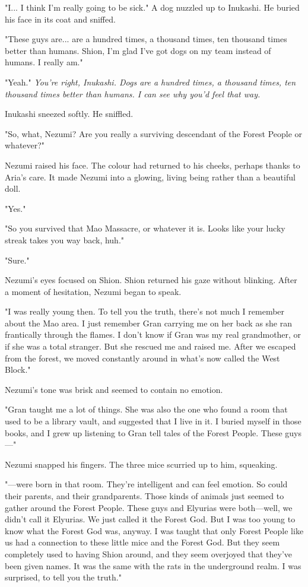 "I... I think I'm really going to be sick." A dog nuzzled up to
Inukashi. He buried his face in its coat and sniffed.

"These guys are... are a hundred times, a thousand times, ten thousand
times better than humans. Shion, I'm glad I've got dogs on my team
instead of humans. I really am."

"Yeah." \emph{You're right, Inukashi. Dogs are a hundred times, a thousand
times, ten thousand times better than humans. I can see why you'd feel
that way.}

Inukashi sneezed softly. He sniffled.

"So, what, Nezumi? Are you really a surviving descendant of the Forest
People or whatever?"

Nezumi raised his face. The colour had returned to his cheeks, perhaps
thanks to Aria's care. It made Nezumi into a glowing, living being
rather than a beautiful doll.

"Yes."

"So you survived that Mao Massacre, or whatever it is. Looks like your
lucky streak takes you way back, huh."

"Sure."

Nezumi's eyes focused on Shion. Shion returned his gaze without
blinking. After a moment of hesitation, Nezumi began to speak.

"I was really young then. To tell you the truth, there's not much I
remember about the Mao area. I just remember Gran carrying me on her
back as she ran frantically through the flames. I don't know if Gran was
my real grandmother, or if she was a total stranger. But she rescued me
and raised me. After we escaped from the forest, we moved constantly
around in what's now called the West Block."

Nezumi's tone was brisk and seemed to contain no emotion.

"Gran taught me a lot of things. She was also the one who found a room
that used to be a library vault, and suggested that I live in it. I
buried myself in those books, and I grew up listening to Gran tell tales
of the Forest People. These guys---"

Nezumi snapped his fingers. The three mice scurried up to him,
squeaking.

"---were born in that room. They're intelligent and can feel emotion. So
could their parents, and their grandparents. Those kinds of animals just
seemed to gather around the Forest People. These guys and Elyurias were
both---well, we didn't call it Elyurias. We just called it the Forest God.
But I was too young to know what the Forest God was, anyway. I was
taught that only Forest People like us had a connection to these little
mice and the Forest God. But they seem completely used to having Shion
around, and they seem overjoyed that they've been given names. It was
the same with the rats in the underground realm. I was surprised, to
tell you the truth."

